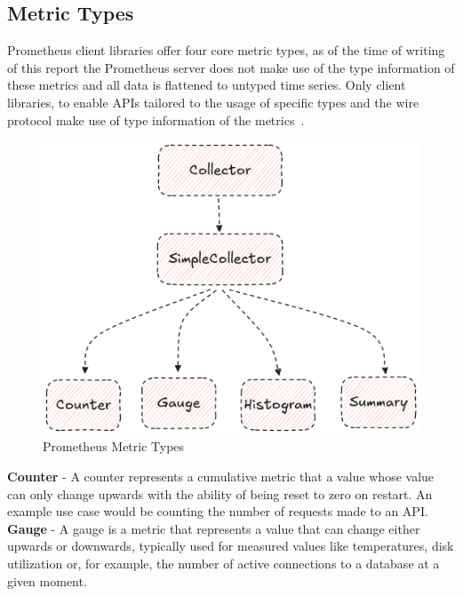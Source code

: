 \subsection{Metric Types}\label{subsec:metric-types}

Prometheus client libraries offer four core metric types, as of the time of writing of this report the Prometheus
server does not make use of the type information of these metrics and all data is flattened to untyped time series.
Only client libraries, to enable \ac{API}s tailored to the usage of specific types and the wire protocol make use of
type information of the metrics~\cite{prometheus_metric_types}.\\

\begin{figure}[h]
    \centering
    \includegraphics[width=\linewidth, keepaspectratio]{./figures/metric_types}
    \caption{Prometheus Metric Types}
\end{figure}

\textbf{Counter} - A counter represents a cumulative metric that a value whose value can only change upwards with
the ability of being reset to zero on restart.
An example use case would be counting the number of requests made to an \ac{API}.\\

\textbf{Gauge} - A gauge is a metric that represents a value that can change either upwards or downwards, typically
used for measured values like temperatures, disk utilization or, for example, the number of active connections
to a database at a given moment.

